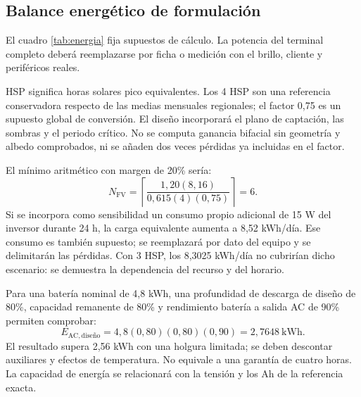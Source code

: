 \subsection{Balance energético de formulación}
El cuadro \ref{tab:energia} fija supuestos de cálculo. La potencia del terminal completo deberá reemplazarse por ficha o medición con el brillo, cliente y periféricos reales.

HSP significa horas solares pico equivalentes. Los 4 HSP son una referencia conservadora respecto de las medias mensuales regionales; el factor 0,75 es un supuesto global de conversión. El diseño incorporará el plano de captación, las sombras y el periodo crítico. No se computa ganancia bifacial sin geometría y albedo comprobados, ni se añaden dos veces pérdidas ya incluidas en el factor.

El mínimo aritmético con margen de 20\% sería:
\[
N_{\mathrm{FV}}=\left\lceil\frac{1,20(8,16)}{0,615(4)(0,75)}\right\rceil=6.
\]
Si se incorpora como sensibilidad un consumo propio adicional de 15 W del inversor durante 24 h, la carga equivalente aumenta a 8,52 kWh/día. Ese consumo es también supuesto; se reemplazará por dato del equipo y se delimitarán las pérdidas. Con 3 HSP, los 8,3025 kWh/día no cubrirían dicho escenario: se demuestra la dependencia del recurso y del horario.

Para una batería nominal de 4,8 kWh, una profundidad de descarga de diseño de 80\%, capacidad remanente de 80\% y rendimiento batería a salida AC de 90\% permiten comprobar:
\[
E_{\mathrm{AC,diseño}}=4,8(0,80)(0,80)(0,90)=2,7648\ \mathrm{kWh}.
\]
El resultado supera 2,56 kWh con una holgura limitada; se deben descontar auxiliares y efectos de temperatura. No equivale a una garantía de cuatro horas. La capacidad de energía se relacionará con la tensión y los Ah de la referencia exacta.

